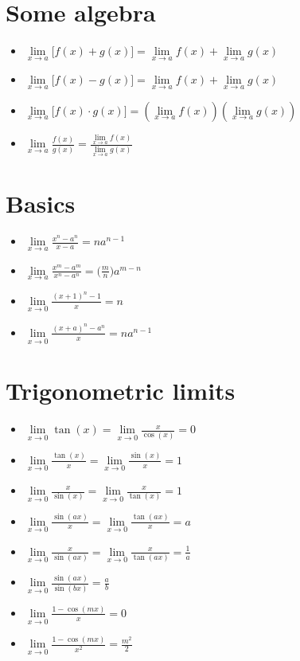 \documentclass{article}
\begin{document}
\section{Some algebra}
\begin{itemize}
\item $\lim\limits_{x \to a}\bigl[f(x) + g(x)\bigr] =
\lim\limits_{x \to a}f(x) + \lim\limits_{x \to a}g(x)$
\item $\lim\limits_{x \to a}\bigl[f(x) - g(x)\bigr] =
\lim\limits_{x \to a}f(x) + \lim\limits_{x \to a}g(x)$
\item $\lim\limits_{x \to a}\bigl[f(x) \cdot g(x)\bigr] =
\left(\lim\limits_{x \to a}f(x)\right)\left(\lim\limits_{x \to a}g(x)\right)$
\item $\lim\limits_{x \to a}\frac{f(x)}{g(x)} =
\frac{\lim\limits_{x \to a}f(x)}{\lim\limits_{x \to a}g(x)}$
\end{itemize}

\section{Basics}
\begin{itemize} 
\item $\lim\limits_{x \to a}\frac{x^n - a^n}{x - a} = na^{n-1}$
\item $\lim\limits_{x \to a}\frac{x^m - a^m}{x^n - a^n} = \bigl(\frac{m}{n}\bigr)a^{m-n}$
\item $\lim\limits_{x \to 0}\frac{(x+1)^n-1}{x} = n$
\item $\lim\limits_{x \to 0}\frac{(x+a)^n - a^n}{x} = na^{n-1}$
\end{itemize} 

\section{Trigonometric limits}
\begin{itemize}
\item $\lim\limits_{x \to 0}\tan(x) =
\lim\limits_{x \to 0}\frac{x}{\cos(x)} = 0$
\item $\lim\limits_{x \to 0}\frac{\tan(x)}{x} =
\lim\limits_{x \to 0}\frac{\sin(x)}{x} = 1$
\item $\lim\limits_{x \to 0}\frac{x}{\sin(x)} = 
\lim\limits_{x \to 0}\frac{x}{\tan(x)} = 1$
\item $\lim\limits_{x \to 0}\frac{\sin(ax)}{x} =
\lim\limits_{x \to 0}\frac{\tan(ax)}{x} = a$
\item $\lim\limits_{x \to 0}\frac{x}{\sin(ax)} =
\lim\limits_{x \to 0}\frac{x}{\tan(ax)} = \frac{1}{a}$
\item $\lim\limits_{x \to 0}\frac{\sin(ax)}{\sin(bx)} = \frac{a}{b}$
\item $\lim\limits_{x \to 0}\frac{1 - \cos(mx)}{x} = 0$
\item $\lim\limits_{x \to 0}\frac{1 - \cos(mx)}{x^2} = \frac{m^2}{2}$
\end{itemize}
\end{document}
